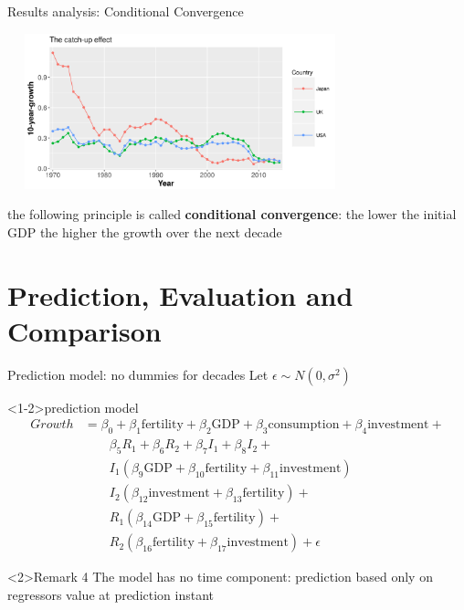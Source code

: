 \documentclass[9pt]{beamer}
\begin{document}
\begin{frame}{Results analysis: Conditional Convergence}
	
	\begin{block}{}
		\includegraphics[height=4.5cm,width=10cm]{convergence.png}
	\end{block}
	\begin{definition}
		the following principle is called \textbf{conditional convergence}: the lower the initial GDP the higher the growth over the next decade
	\end{definition}
			
\end{frame}


\section{Prediction, Evaluation and Comparison}

\begin{frame}{Prediction model: no dummies for decades}
	Let $ \epsilon \sim N(0,\sigma^2)$
	\begin{block}<1-2>{prediction model}
		\begin{align*}
		Growth &= \beta_0+\beta_1\text{fertility}+\beta_2\text{GDP}+\beta_3\text{consumption}+\beta_4\text{investment}+\\
		& \qquad 
		\beta_5R_1+\beta_{6}R_2+\beta_{7}I_1+\beta_{8}I_2+\\
		& \qquad
        I_1(\beta_{9}\text{GDP}+\beta_{10}\text{fertility}+\beta_{11}\text{investment})\\
		& \qquad 
		I_2(\beta_{12}\text{investment} + \beta_{13}\text{fertility}) +\\
		&\qquad R_1(\beta_{14}\text{GDP}+\beta_{15}\text{fertility})+\\
		&\qquad
		R_2(\beta_{16}\text{fertility}+\beta_{17}\text{investment}) + \epsilon \end{align*}
	\end{block}
	\begin{alertblock}{Remark 4}
		The model has no time component: prediction based only on regressors value at prediction instant
	\end{alertblock}
	
\end{frame}
\end{document}
